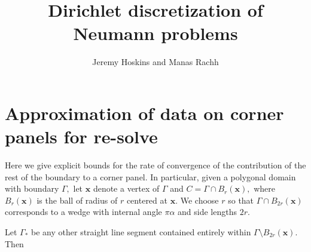 \documentclass[12pt]{article}
\newcommand{\bx}{\boldsymbol{x}}
\begin{document}
 \title{Dirichlet discretization of Neumann problems}
 \author{Jeremy Hoskins and Manas Rachh}
 \maketitle









\appendix
\section{Approximation of data on corner panels for re-solve}
Here we give explicit bounds for the rate of convergence of the contribution of the rest of the boundary to a corner panel. In particular, given a polygonal domain with boundary $\Gamma,$ let $\bx$ denote a vertex of $\Gamma$ and $C = \Gamma \cap B_r(\bx),$ where $B_r(\bx)$ is the ball of radius of $r$ centered at $\bx.$ We choose $r$ so that $\Gamma \cap B_{2r}(\bx)$ corresponds to a wedge with internal angle $\pi \alpha$ and side lengths $2r.$ 

Let $\Gamma_*$ be any other straight line segment contained entirely within $\Gamma \setminus B_{2r}(\bx).$ Then
\end{document}
